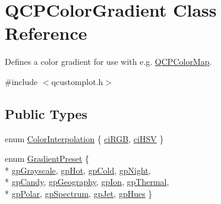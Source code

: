 \hypertarget{class_q_c_p_color_gradient}{}\section{Q\+C\+P\+Color\+Gradient Class Reference}
\label{class_q_c_p_color_gradient}


Defines a color gradient for use with e.\+g. \hyperlink{class_q_c_p_color_map}{Q\+C\+P\+Color\+Map}.  




{\ttfamily \#include $<$qcustomplot.\+h$>$}

\subsection*{Public Types}
\begin{DoxyCompactItemize}
\item 
enum \hyperlink{class_q_c_p_color_gradient_ac5dca17cc24336e6ca176610e7f77fc1}{Color\+Interpolation} \{ \hyperlink{class_q_c_p_color_gradient_ac5dca17cc24336e6ca176610e7f77fc1a5e30f725c9cfe93999e268a9f92afbe7}{ci\+R\+G\+B}, 
\hyperlink{class_q_c_p_color_gradient_ac5dca17cc24336e6ca176610e7f77fc1af14ae62fcae11ecc07234eeaec5856cb}{ci\+H\+S\+V}
 \}
\item 
enum \hyperlink{class_q_c_p_color_gradient_aed6569828fee337023670272910c9072}{Gradient\+Preset} \{ \\*
\hyperlink{class_q_c_p_color_gradient_aed6569828fee337023670272910c9072add11ae369a86f3b1b6205ec72e5021fb}{gp\+Grayscale}, 
\hyperlink{class_q_c_p_color_gradient_aed6569828fee337023670272910c9072a4f42e534cf6cff5a29a5388094d099b5}{gp\+Hot}, 
\hyperlink{class_q_c_p_color_gradient_aed6569828fee337023670272910c9072aec8c001f62c0d5cb853db5fd85309557}{gp\+Cold}, 
\hyperlink{class_q_c_p_color_gradient_aed6569828fee337023670272910c9072a1bb89351b6def7d220973443fe059c62}{gp\+Night}, 
\\*
\hyperlink{class_q_c_p_color_gradient_aed6569828fee337023670272910c9072a9e72663bf6b94b65945f7843f24e0721}{gp\+Candy}, 
\hyperlink{class_q_c_p_color_gradient_aed6569828fee337023670272910c9072a382f0b07cec1a59d8a533438aea815d2}{gp\+Geography}, 
\hyperlink{class_q_c_p_color_gradient_aed6569828fee337023670272910c9072a4297f4f9e212a819cd65e8e34567182b}{gp\+Ion}, 
\hyperlink{class_q_c_p_color_gradient_aed6569828fee337023670272910c9072af1676b129f9f458ace453f280c731cf7}{gp\+Thermal}, 
\\*
\hyperlink{class_q_c_p_color_gradient_aed6569828fee337023670272910c9072ab7414ce4e36dc3e82e0132a7f0f41b52}{gp\+Polar}, 
\hyperlink{class_q_c_p_color_gradient_aed6569828fee337023670272910c9072ad63adc100ef46f6b4a8a6deacec4642f}{gp\+Spectrum}, 
\hyperlink{class_q_c_p_color_gradient_aed6569828fee337023670272910c9072a5f8a9e67b64c17ddfe4f069fe2b9fb02}{gp\+Jet}, 
\hyperlink{class_q_c_p_color_gradient_aed6569828fee337023670272910c9072a30efe58407acfb67939032f70213a130}{gp\+Hues}
 \}
\end{DoxyCompactItemize}
